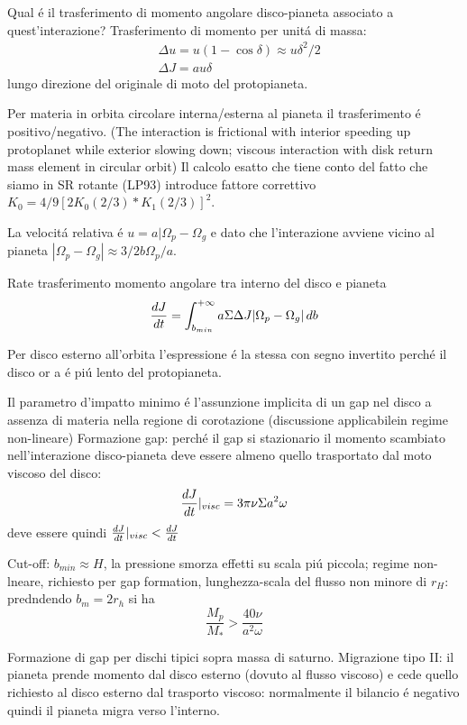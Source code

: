 Qual \'e il trasferimento di momento angolare disco-pianeta associato a quest'interazione?
Trasferimento di momento per unit\'a di massa:
\begin{align}
&\Delta u=u(1-\cos{\delta})\approx u\delta^2/2\\
&\Delta J=au\delta
\end{align}
lungo direzione del originale di moto del protopianeta.

Per materia in orbita circolare interna/esterna al pianeta il trasferimento \'e positivo/negativo.
(The interaction is frictional with interior speeding up protoplanet while exterior slowing down; viscous interaction with disk return mass element in circular orbit)
Il calcolo esatto che tiene conto del fatto che siamo in SR rotante (LP93) introduce fattore correttivo $K_0=4/9[2K_0(2/3)*K_1(2/3)]^2$.

La velocit\'a relativa \'e $u=a|\Omega_p-\Omega_g$ e dato che l'interazione avviene vicino al pianeta $|\Omega_p-\Omega_g|\approx3/2b\Omega_p/a$.

Rate trasferimento momento angolare tra interno del disco e pianeta
\begin{equation}
\TDy{t}{J}=\int_{b_{min}}^{+\infty}a\Sigma\Delta J|\Omega_p-\Omega_g|\,db
\end{equation}

Per disco esterno all'orbita l'espressione \'e la stessa con segno invertito perch\'e il disco or a \'e pi\'u lento del protopianeta.

Il parametro d'impatto minimo \'e l'assunzione implicita di un gap nel disco a assenza di materia nella regione di corotazione (discussione applicabilein regime non-lineare)
Formazione gap: perch\'e il gap si stazionario il momento scambiato nell'interazione disco-pianeta deve essere almeno quello trasportato dal moto viscoso del disco:
\begin{equation}
\TDy{t}{J}|_{visc}=3\pi\nu\Sigma a^2\omega
\end{equation}
deve essere quindi $\TDy{t}{J}|_{visc}<\TDy{t}{J}$

Cut-off: $b_{min}\approx H$, la pressione smorza effetti su scala pi\'u piccola; regime non-lneare, richiesto per gap formation, lunghezza-scala del flusso non minore di $r_H$: predndendo $b_m=2r_h$ si ha
\begin{equation}
\frac{M_p}{M_*}>\frac{40\nu}{a^2\omega}
\end{equation}

Formazione di gap per dischi tipici sopra massa di saturno.
Migrazione tipo II: il pianeta prende momento dal disco esterno (dovuto al flusso viscoso) e cede quello richiesto al disco esterno dal trasporto viscoso: normalmente il bilancio \'e negativo quindi il pianeta migra verso l'interno.

